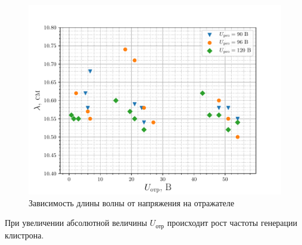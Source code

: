 \begin{figure}[h!]
		\centering
		\includegraphics[width=\linewidth]{fig/task4a}
		\caption{Зависимость длины волны от напряжения на отражателе}
		\label{fig:task4a}
\end{figure}

При увеличении абсолютной величины $U_{\text{отр}}$ происходит рост частоты генерации клистрона. 

